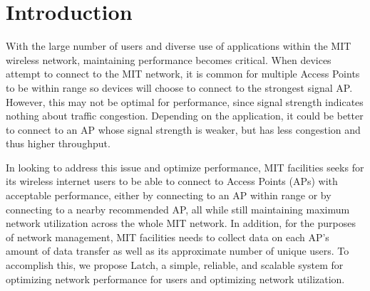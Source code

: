 \documentclass[journal]{IEEEtran}
\begin{document}




\maketitle








%
\IEEEpeerreviewmaketitle



\section{Introduction}
With the large number of users and diverse use of applications within the MIT wireless network, maintaining performance becomes critical. When devices attempt to connect to the MIT network, it is common for multiple Access Points to be within range so devices will choose to connect to the strongest signal AP. However, this may not be optimal for performance, since signal strength indicates nothing about traffic congestion. Depending on the application, it could be better to connect to an AP whose signal strength is weaker, but has less congestion and thus higher throughput.

In looking to address this issue and optimize performance, MIT facilities seeks for its wireless internet users to be able to connect to Access Points (APs) with acceptable performance, either by connecting to an AP within range or by connecting to a nearby recommended AP, all while still maintaining maximum network utilization across the whole MIT network. In addition, for the purposes of network management, MIT facilities needs to collect data on each AP's amount of data transfer as well as its approximate number of unique users. To accomplish this, we propose Latch, a simple, reliable, and scalable system for optimizing network performance for users and optimizing network utilization.
\end{document}
